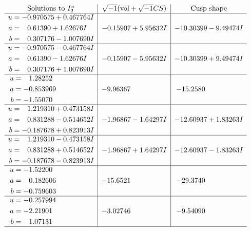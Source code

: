\documentclass[1p]{elsarticle_modified}
\theoremstyle{definition}
\newcommand{\I}{\sqrt{-1}}
\begin{document}
$$\begin{array}{c|c|c}  
\text{Solutions to }I^u_{2}& \I (\text{vol} + \sqrt{-1}CS) & \text{Cusp shape}\\
 \hline 
\begin{aligned}
u &= -0.970575 + 0.467764 I \\
a &= \phantom{-}0.61390 + 1.62676 I \\
b &= \phantom{-}0.307176 - 1.007690 I\end{aligned}
 & -0.15907 + 5.95632 I & -10.30399 - 9.49474 I \\ \hline\begin{aligned}
u &= -0.970575 - 0.467764 I \\
a &= \phantom{-}0.61390 - 1.62676 I \\
b &= \phantom{-}0.307176 + 1.007690 I\end{aligned}
 & -0.15907 - 5.95632 I & -10.30399 + 9.49474 I \\ \hline\begin{aligned}
u &= \phantom{-}1.28252\phantom{ +0.000000I} \\
a &= -0.853969\phantom{ +0.000000I} \\
b &= -1.55070\phantom{ +0.000000I}\end{aligned}
 & -9.96367\phantom{ +0.000000I} & -15.2580\phantom{ +0.000000I} \\ \hline\begin{aligned}
u &= \phantom{-}1.219310 + 0.473158 I \\
a &= \phantom{-}0.831288 - 0.514652 I \\
b &= -0.187678 + 0.823913 I\end{aligned}
 & -1.96867 - 1.64297 I & -12.60937 + 1.83263 I \\ \hline\begin{aligned}
u &= \phantom{-}1.219310 - 0.473158 I \\
a &= \phantom{-}0.831288 + 0.514652 I \\
b &= -0.187678 - 0.823913 I\end{aligned}
 & -1.96867 + 1.64297 I & -12.60937 - 1.83263 I \\ \hline\begin{aligned}
u &= -1.52200\phantom{ +0.000000I} \\
a &= \phantom{-}0.182606\phantom{ +0.000000I} \\
b &= -0.759603\phantom{ +0.000000I}\end{aligned}
 & -15.6521\phantom{ +0.000000I} & -29.3740\phantom{ +0.000000I} \\ \hline\begin{aligned}
u &= -0.257994\phantom{ +0.000000I} \\
a &= -2.21901\phantom{ +0.000000I} \\
b &= \phantom{-}1.07131\phantom{ +0.000000I}\end{aligned}
 & -3.02746\phantom{ +0.000000I} & -9.54090\phantom{ +0.000000I}\\
 \hline 
 \end{array}$$\newpage\newpage\renewcommand{\arraystretch}{1}
\end{document}
